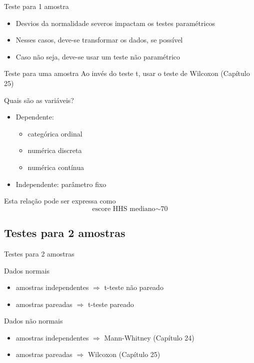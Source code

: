 \documentclass{beamer}
\begin{document}
\begin{frame}{Teste para 1 amostra}
  \begin{itemize}
  \item Desvios da normalidade severos impactam os testes paramétricos
  \item Nesses casos, deve-se transformar os dados, se possível
  \item Caso não seja, deve-se usar um teste não paramétrico
  \end{itemize}
  \begin{block}{Teste para uma amostra}
    Ao invés do teste t, usar o teste de Wilcoxon (Capítulo 25)
  \end{block}
\end{frame}

\begin{frame}{Quais são as variáveis?}
  \begin{itemize}
    \small
  \item Dependente:
    \begin{itemize}
      \footnotesize
    \item categórica ordinal
    \item numérica discreta
    \item numérica contínua
    \end{itemize}
  \item Independente: parâmetro fixo
  \end{itemize}
  \vfill
  \begin{block}{Esta relação pode ser expressa como}
    \begin{displaymath}
      \text{escore HHS mediano} \sim \text{70}
    \end{displaymath}
  \end{block}
\end{frame}

\subsection[2 médias]{Testes para 2 amostras}

\begin{frame}{Testes para 2 amostras}
  \begin{block}{Dados normais}
    \begin{itemize}
    \item amostras independentes $\Rightarrow$ t-teste não pareado
    \item amostras pareadas $\Rightarrow$ t-teste pareado
    \end{itemize}
  \end{block}
  \begin{block}{Dados não normais}
    \begin{itemize}
    \item amostras independentes $\Rightarrow$ \alert{Mann-Whitney} (Capítulo 24)%
    \item amostras pareadas $\Rightarrow$ Wilcoxon (Capítulo 25)
    \end{itemize}
  \end{block}
\end{frame}
\end{document}
